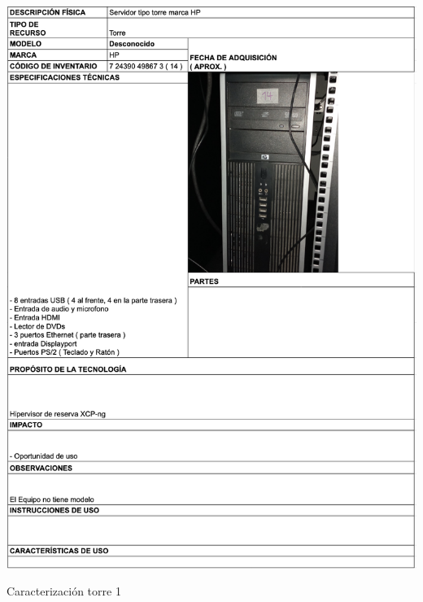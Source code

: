 \begin{table}[H]
    \centering
    \includegraphics[width=\textwidth]{tablas-images/cp1/torres/torre-1.png}
    \caption{Caracterización torre 1}\label{tab:torre-1}
\end{table}

